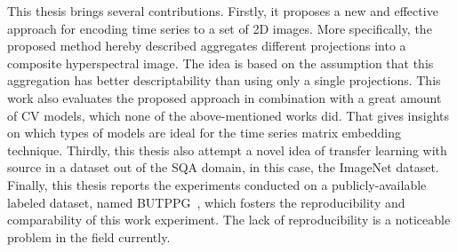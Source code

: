 This thesis brings several contributions. Firstly, it proposes a new and effective approach for encoding time series to a set of 2D images. More specifically, the proposed method hereby described aggregates different projections into a composite hyperspectral image. The idea is based on the assumption that this aggregation has better descriptability than using only a single projections. This work also evaluates the proposed approach in combination with a great amount of \gls{CV} models, which none of the above-mentioned works did. That gives insights on which types of models are ideal for the time series matrix embedding technique. Thirdly, this thesis also attempt a novel idea of transfer learning with source in a dataset out of the \gls{SQA} domain, in this case, the ImageNet dataset. Finally, this thesis reports the experiments conducted on a publicly-available labeled dataset, named \gls{BUTPPG}~\cite{butppg}, which fosters the reproducibility and comparability of this work experiment. The lack of reproducibility is a noticeable problem in the field currently.
